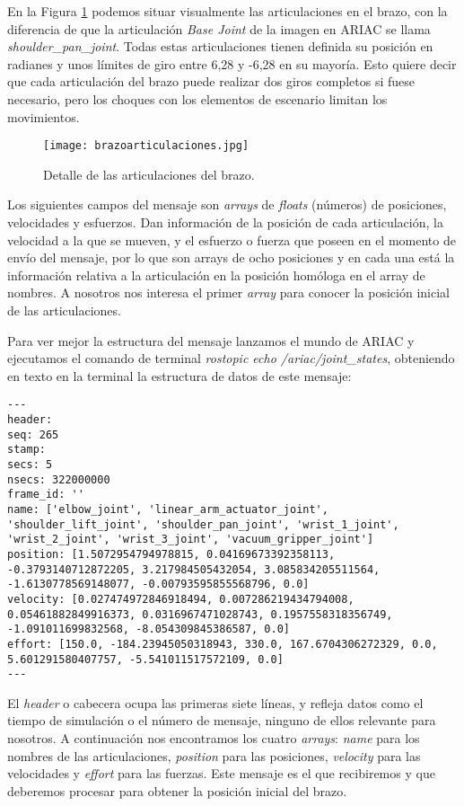 En la Figura \ref{fig:brazoarticulaciones} podemos situar visualmente las articulaciones en el brazo, con la diferencia de que la articulación \textit{Base Joint} de la imagen en ARIAC se llama \textit{shoulder\_pan\_joint}. Todas estas articulaciones tienen definida su posición en radianes y unos límites de giro entre 6,28 y -6,28 en su mayoría. Esto quiere decir que cada articulación del brazo puede realizar dos giros completos si fuese necesario, pero los choques con los elementos de escenario limitan los movimientos.

\begin{figure}[]
	\centering\texttt{[image: brazoarticulaciones.jpg]}
	\caption{Detalle de las articulaciones del brazo.}
	\label{fig:brazoarticulaciones}
\end{figure}

Los siguientes campos del mensaje son \textit{arrays} de \textit{floats} (números) de posiciones, velocidades y esfuerzos. Dan información de la posición de cada articulación, la velocidad a la que se mueven, y el esfuerzo o fuerza que poseen en el momento de envío del mensaje, por lo que son arrays de ocho posiciones y en cada una está la información relativa a la articulación en la posición homóloga en el array de nombres. A nosotros nos interesa el primer \textit{array} para conocer la posición inicial de las articulaciones.

Para ver mejor la estructura del mensaje lanzamos el mundo de ARIAC y ejecutamos el comando de terminal \textit{rostopic echo /ariac/joint\_states}, obteniendo en texto en la terminal la estructura de datos de este mensaje:

\begin{lstlisting}
---
header: 
seq: 265
stamp: 
secs: 5
nsecs: 322000000
frame_id: ''
name: ['elbow_joint', 'linear_arm_actuator_joint', 'shoulder_lift_joint', 'shoulder_pan_joint', 'wrist_1_joint', 'wrist_2_joint', 'wrist_3_joint', 'vacuum_gripper_joint']
position: [1.5072954794978815, 0.04169673392358113, -0.3793140712872205, 3.217984505432054, 3.085834205511564, -1.6130778569148077, -0.00793595855568796, 0.0]
velocity: [0.027474972846918494, 0.007286219434794008, 0.05461882849916373, 0.0316967471028743, 0.1957558318356749, -1.091011699832568, -8.054309845386587, 0.0]
effort: [150.0, -184.23945050318943, 330.0, 167.6704306272329, 0.0, 5.601291580407757, -5.541011517572109, 0.0]
---
\end{lstlisting}

El \textit{header} o cabecera ocupa las primeras siete líneas, y refleja datos como el tiempo de simulación o el número de mensaje, ninguno de ellos relevante para nosotros. A continuación nos encontramos los cuatro \textit{arrays}: \textit{name} para los nombres de las articulaciones, \textit{position} para las posiciones, \textit{velocity} para las velocidades y \textit{effort} para las fuerzas. Este mensaje es el que recibiremos y que deberemos procesar para obtener la posición inicial del brazo.

